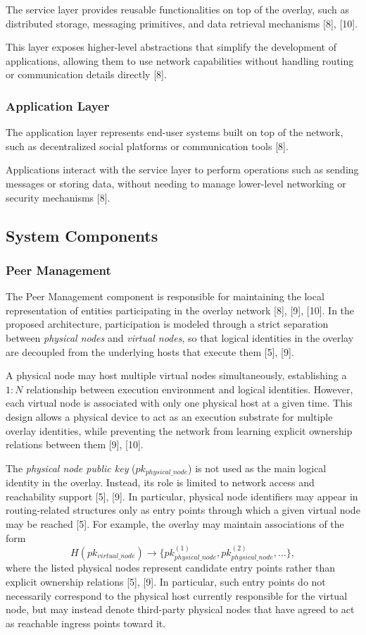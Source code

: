 \documentclass[12pt]{article}
\begin{document}
The service layer provides reusable functionalities on top of the overlay, such as distributed storage, messaging primitives, and data retrieval mechanisms [8], [10].

This layer exposes higher-level abstractions that simplify the development of applications, allowing them to use network capabilities without handling routing or communication details directly [8].

\subsubsection{Application Layer}

The application layer represents end-user systems built on top of the network, such as decentralized social platforms or communication tools [8].

Applications interact with the service layer to perform operations such as sending messages or storing data, without needing to manage lower-level networking or security mechanisms [8].


\subsection{System Components}
\subsubsection{Peer Management}

The Peer Management component is responsible for maintaining the local representation of entities participating in the overlay network [8], [9], [10]. In the proposed architecture, participation is modeled through a strict separation between \textit{physical nodes} and \textit{virtual nodes}, so that logical identities in the overlay are decoupled from the underlying hosts that execute them [5], [9].

A physical node may host multiple virtual nodes simultaneously, establishing a $1:N$ relationship between execution environment and logical identities. However, each virtual node is associated with only one physical host at a given time. This design allows a physical device to act as an execution substrate for multiple overlay identities, while preventing the network from learning explicit ownership relations between them [9], [10].

The \textit{physical node public key} ($pk_{physical\_node}$) is not used as the main logical identity in the overlay. Instead, its role is limited to network access and reachability support [5], [9]. In particular, physical node identifiers may appear in routing-related structures only as entry points through which a given virtual node may be reached [5]. For example, the overlay may maintain associations of the form
\[
H(pk_{virtual\_node}) \rightarrow \{pk_{physical\_node}^{(1)}, pk_{physical\_node}^{(2)}, \dots\},
\]
where the listed physical nodes represent candidate entry points rather than explicit
ownership relations [5], [9]. In particular, such entry points do not necessarily correspond
to the physical host currently responsible for the virtual node, but may instead denote
third-party physical nodes that have agreed to act as reachable ingress points toward it.
\end{document}
